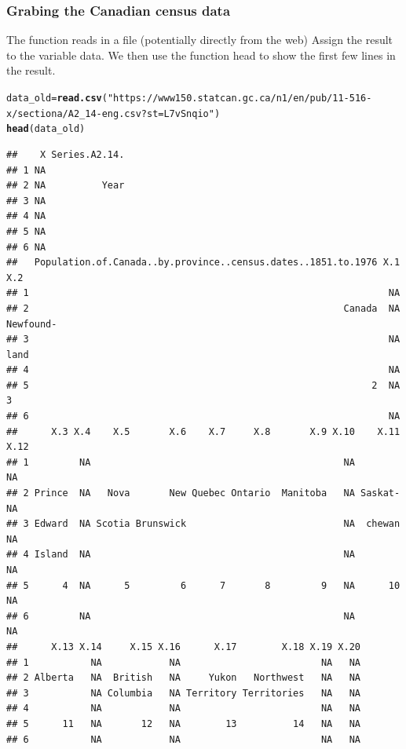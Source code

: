 \documentclass[aspectratio=169]{beamer}\usepackage[]{graphicx}\usepackage[]{xcolor}
\makeatletter
\newcommand{\hlsng}[1]{\textcolor[rgb]{0.192,0.494,0.8}{#1}}%
\newcommand{\hldef}[1]{\textcolor[rgb]{0.345,0.345,0.345}{#1}}%
\newcommand{\hlkwb}[1]{\textcolor[rgb]{0.69,0.353,0.396}{#1}}%
\newcommand{\hlkwd}[1]{\textcolor[rgb]{0.737,0.353,0.396}{\textbf{#1}}}%
\newenvironment{kframe}{%
 \def\at@end@of@kframe{}%
 \ifinner\ifhmode%
  \def\at@end@of@kframe{\end{minipage}}%
  \begin{minipage}{\columnwidth}%
 \fi\fi%
 \def\FrameCommand##1{\hskip\@totalleftmargin \hskip-\fboxsep
 \colorbox{shadecolor}{##1}\hskip-\fboxsep
     \hskip-\linewidth \hskip-\@totalleftmargin \hskip\columnwidth}%
 \MakeFramed {\advance\hsize-\width
   \@totalleftmargin\z@ \linewidth\hsize
   \@setminipage}}%
 {\par\unskip\endMakeFramed%
 \at@end@of@kframe}
\newenvironment{knitrout}{}{} %
\makeatother
\begin{document}
\begin{frame}[fragile]\frametitle{Grabing the Canadian census data}
The function  reads in a file (potentially directly from the web)
\vfill
Assign the result to the variable data. We then use the function head to show the first few lines in the result.
\vfill
\begin{knitrout}
\color{fgcolor}\begin{kframe}
\begin{alltt}
\hldef{data_old} \hlkwb{=} \hlkwd{read.csv}\hldef{(}\hlsng{"https://www150.statcan.gc.ca/n1/en/pub/11-516-x/sectiona/A2_14-eng.csv?st=L7vSnqio"}\hldef{)}
\hlkwd{head}\hldef{(data_old)}
\end{alltt}
\begin{verbatim}
##    X Series.A2.14.
## 1 NA              
## 2 NA          Year
## 3 NA              
## 4 NA              
## 5 NA              
## 6 NA              
##   Population.of.Canada..by.province..census.dates..1851.to.1976 X.1       X.2
## 1                                                                NA          
## 2                                                        Canada  NA Newfound-
## 3                                                                NA      land
## 4                                                                NA          
## 5                                                             2  NA         3
## 6                                                                NA          
##      X.3 X.4    X.5       X.6    X.7     X.8       X.9 X.10    X.11 X.12
## 1         NA                                             NA           NA
## 2 Prince  NA   Nova       New Quebec Ontario  Manitoba   NA Saskat-   NA
## 3 Edward  NA Scotia Brunswick                            NA  chewan   NA
## 4 Island  NA                                             NA           NA
## 5      4  NA      5         6      7       8         9   NA      10   NA
## 6         NA                                             NA           NA
##      X.13 X.14     X.15 X.16      X.17        X.18 X.19 X.20
## 1           NA            NA                         NA   NA
## 2 Alberta   NA  British   NA     Yukon   Northwest   NA   NA
## 3           NA Columbia   NA Territory Territories   NA   NA
## 4           NA            NA                         NA   NA
## 5      11   NA       12   NA        13          14   NA   NA
## 6           NA            NA                         NA   NA
\end{verbatim}
\end{kframe}
\end{knitrout}
\end{frame}
\end{document}
